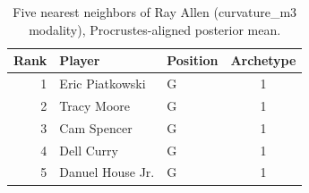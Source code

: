 \begin{table}[htbp]
  \centering\small
  \begin{tabular}{rllc}
    \toprule
    Rank & Player & Position & Archetype \\
    \midrule
    1 & Eric Piatkowski & G & 1 \\
    2 & Tracy Moore & G & 1 \\
    3 & Cam Spencer & G & 1 \\
    4 & Dell Curry & G & 1 \\
    5 & Danuel House Jr. & G & 1 \\
    \bottomrule
  \end{tabular}
  \caption{Five nearest neighbors of Ray Allen (curvature_m3 modality), Procrustes-aligned posterior mean.}
  \label{tab:Ray_Allen_neighbors_curvature_m3}
\end{table}

